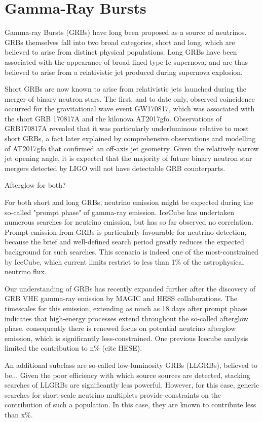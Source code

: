 \section{Gamma-Ray Bursts}

Gamma-ray Bursts (GRBs) have long been proposed as a source of neutrinos. GRBs themselves fall into two broad categories, short and long, which are believed to arise from distinct physical populations. Long GRBs have been associated with the appearance of broad-lined type Ic supernova, and are thus believed to arise from a relativistic jet produced during supernova explosion. 

Short GRBs are now known to arise from relativistic jets launched during the merger of binary neutron stars. The first, and to date only, observed coincidence occurred for the gravitational wave event GW170817, which was associated with the short GRB 170817A and the kilonova AT2017gfo. Observations of GRB170817A revealed that it was particularly underluminous relative to most short GRBs, a fact later explained by comprehensive observations and modelling of AT2017gfo that confirmed an off-axis jet geometry. Given the relatively narrow jet opening angle, it is expected that the majority of future binary neutron star mergers detected by LIGO will not have detectable GRB counterparts.

Afterglow for both?

For both short and long GRBs, neutrino emission might be expected during the so-called "prompt phase" of gamma-ray emission. IceCube has undertaken numerous searches for neutrino emission, but has so far observed no correlation. Prompt emission from GRBs is particularly favourable for neutrino detection, because the brief and well-defined search period greatly reduces the expected background for such searches. This scenario is indeed one of the most-constrained by IceCube, which current limits restrict to less than 1\% of the astrophysical neutrino flux. 

Our understanding of GRBs has recently expanded further after the discovery of GRB VHE gamma-ray emission by MAGIC and HESS collaborations. The timescales for this emission, extending as much as 18 days after prompt phase indicates that high-energy processes extend throughout the so-called afterglow phase. consequently there is renewed focus on potential neutrino afterglow  emission, which is significantly less-constrained. One previous Icecube analysis limited the contribution to n\% (cite HESE).

An additional subclass are so-called low-luminosity GRBs (LLGRBs), believed to be... Given the poor efficiency with which source sources are detected, stacking searches of LLGRBs are significantly less powerful. However, for this case, generic searches for short-scale neutrino multiplets provide constraints on the contribution of such a population. In this case, they are known to contribute less than x\%.
